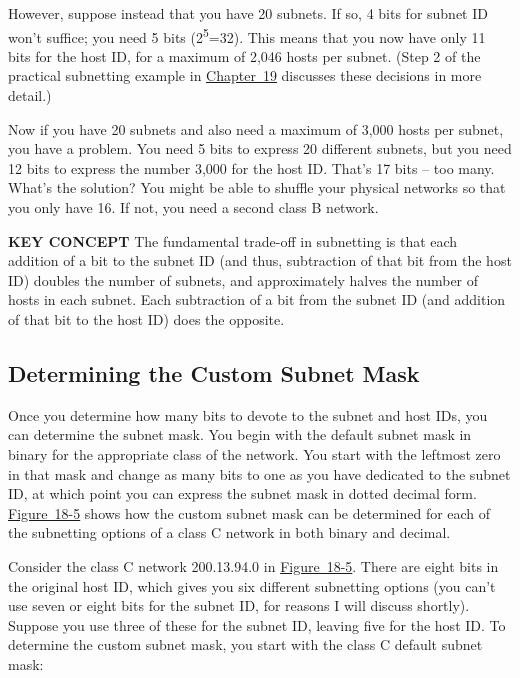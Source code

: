 \documentclass[b5paper,11pt]{memoir}
\begin{document}
However, suppose instead that you have 20 subnets. If so, 4 bits for
subnet ID won't suffice; you need 5 bits (2\textsuperscript{5}=32). This
means that you now have only 11 bits for the host ID, for a maximum of
2,046 hosts per subnet. (Step 2 of the practical subnetting example in
\protect\hyperlink{ch19.html}{Chapter~19} discusses these decisions in
more detail.)

Now if you have 20 subnets and also need a maximum of 3,000 hosts per
subnet, you have a problem. You need 5 bits to express 20 different
subnets, but you need 12 bits to express the number 3,000 for the host
ID. That's 17 bits -- too many. What's the solution? You might be able to
shuffle your physical networks so that you only have 16. If not, you
need a second class B network.


{\textbf{KEY CONCEPT}} The fundamental trade-off in subnetting is that
each addition of a bit to the subnet ID (and thus, subtraction of that
bit from the host ID) doubles the number of subnets, and approximately
halves the number of hosts in each subnet. Each subtraction of a bit
from the subnet ID (and addition of that bit to the host ID) does the
opposite.

\subsection[Determining the Custom Subnet
Mask]{\texorpdfstring{\protect\hypertarget{ch18s05.htmlux5cux23determining_the_custom_subnet_mask}{}{}Determining
the Custom Subnet Mask}{Determining the Custom Subnet Mask}}

Once you determine how many bits to devote to the subnet and host IDs,
you can determine the subnet mask. You begin with the default subnet
mask in binary for the appropriate class of the network. You start with
the leftmost zero in that mask and change as many bits to one as you
have dedicated to the subnet ID, at which point you can express the
subnet mask in dotted decimal form.
\protect\hyperlink{ch18s05.htmlux5cux23custom_subnet_masks_for_class_c_networks}{Figure~18-5}
shows how the custom subnet mask can be determined for each of the
subnetting options of a class C network in both binary and decimal.

Consider the class C network 200.13.94.0 in
\protect\hyperlink{ch18s05.htmlux5cux23custom_subnet_masks_for_class_c_networks}{Figure~18-5}.
There are eight bits in the original host ID, which gives you six
different subnetting options (you can't use seven or eight bits for the
subnet ID, for reasons I will discuss shortly). Suppose you use three of
these for the subnet ID, leaving five for the host ID. To determine the
custom subnet mask, you start with the class C default subnet mask:
\end{document}
